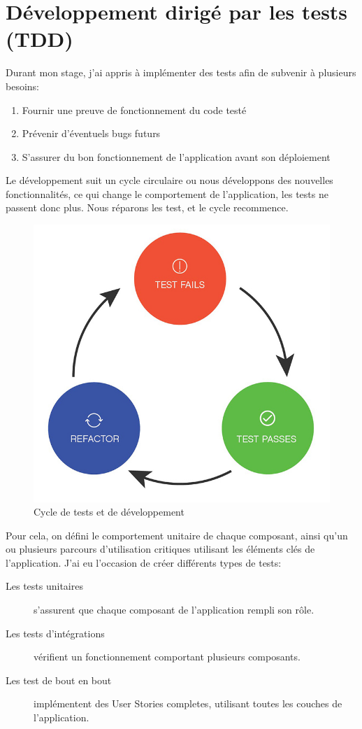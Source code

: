 \documentclass[12pt, a4paper]{report}
\begin{document}
    \section{Développement dirigé par les tests (TDD)}
        Durant mon stage, j'ai appris à implémenter des tests afin de subvenir à plusieurs besoins\@:
        \begin{enumerate}
            \item Fournir une preuve de fonctionnement du code testé
            \item Prévenir d'éventuels bugs futurs
            \item S'assurer du bon fonctionnement de l'application avant son déploiement
        \end{enumerate}
        Le développement suit un cycle circulaire ou nous développons des nouvelles fonctionnalités, ce qui change le comportement de l'application, les tests ne passent donc plus. Nous réparons les test, et le cycle recommence.
        \begin{figure}[H]
            \begin{center}
                \includegraphics[width=0.5\linewidth]{TDD.jpg}
            \end{center}
            \caption{Cycle de tests et de développement}
        \end{figure}
        Pour cela, on défini le comportement unitaire de chaque composant, ainsi qu'un ou plusieurs parcours d'utilisation critiques utilisant les éléments clés de l'application.\newline
        J'ai eu l'occasion de créer différents types de tests\@:
        \begin{description}
            \item [Les tests unitaires] s'assurent que chaque composant de l'application rempli son rôle.
            \item [Les tests d'intégrations] vérifient un fonctionnement comportant plusieurs composants.
            \item [Les test de bout en bout] implémentent des User Stories completes, utilisant toutes les couches de l'application.
        \end{description}
\end{document}
